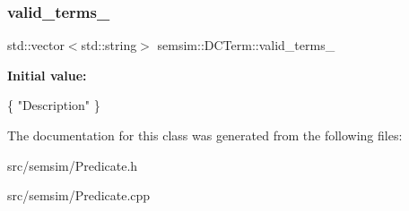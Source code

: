 \subsubsection{\texorpdfstring{valid\+\_\+terms\+\_\+}{valid\_terms\_}}
{\footnotesize\ttfamily std\+::vector$<$std\+::string$>$ semsim\+::\+D\+C\+Term\+::valid\+\_\+terms\+\_\+}

{\bfseries Initial value\+:}
\begin{DoxyCode}
\{
                \textcolor{stringliteral}{"Description"}
        \}
\end{DoxyCode}


The documentation for this class was generated from the following files\+:\begin{DoxyCompactItemize}
\item 
src/semsim/Predicate.\+h\item 
src/semsim/Predicate.\+cpp\end{DoxyCompactItemize}
